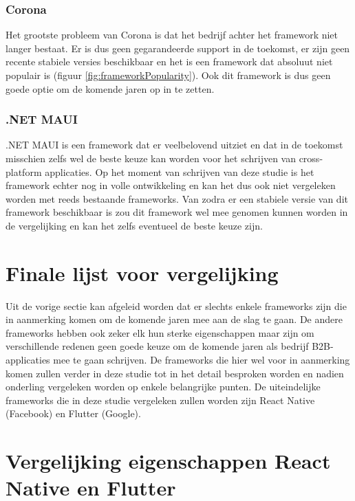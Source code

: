 \subsubsection{Corona}
\label{subsubsec:CoronaEisen}

Het grootste probleem van Corona is dat het bedrijf achter het framework niet langer bestaat. Er is dus geen gegarandeerde support in de toekomst, er zijn geen recente stabiele versies beschikbaar en het is een framework dat absoluut niet populair is (figuur \ref{fig:frameworkPopularity}). Ook dit framework is dus geen goede optie om de komende jaren op in te zetten.

\subsubsection{.NET MAUI}
\label{subsubsec:.NETMAUIEisen}

.NET MAUI is een framework dat er veelbelovend uitziet en dat in de toekomst misschien zelfs wel de beste keuze kan worden voor het schrijven van cross-platform applicaties. Op het moment van schrijven van deze studie is het framework echter nog in volle ontwikkeling en kan het dus ook niet vergeleken worden met reeds bestaande frameworks. Van zodra er een stabiele versie van dit framework beschikbaar is zou dit framework wel mee genomen kunnen worden in de vergelijking en kan het zelfs eventueel de beste keuze zijn.

\section{Finale lijst voor vergelijking}
\label{sec:finaleLijst}

Uit de vorige sectie kan afgeleid worden dat er slechts enkele frameworks zijn die in aanmerking komen om de komende jaren mee aan de slag te gaan. De andere frameworks hebben ook zeker elk hun sterke eigenschappen maar zijn om verschillende redenen geen goede keuze om de komende jaren als bedrijf B2B-applicaties mee te gaan schrijven. De frameworks die hier wel voor in aanmerking komen zullen verder in deze studie tot in het detail besproken worden en nadien onderling vergeleken worden op enkele belangrijke punten. De uiteindelijke frameworks die in deze studie vergeleken zullen worden zijn React Native (Facebook) en Flutter (Google).

\section{Vergelijking eigenschappen React Native en Flutter}
\label{sec:vglEigenschappen}

